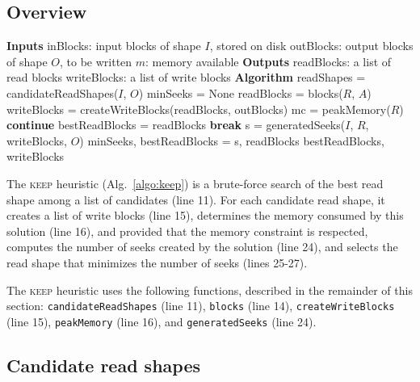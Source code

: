 \documentclass[sigconf, nonacm]{acmart}
\newcommand{\keep}[0]{\textsc{keep}\xspace}
\begin{document}
\subsection{Overview}

\begin{algorithm}
  \caption{\keep heuristic (implements \texttt{getReadWriteBlocks})}
  \label{algo:keep}
  \begin{algorithmic}[1]
    \STATE \textbf{Inputs}
    \STATE inBlocks: input blocks of shape $I$, stored on disk
    \STATE outBlocks: output blocks of shape $O$, to be written
    \STATE $m$: memory available
    \STATE
    \STATE \textbf{Outputs}
    \STATE readBlocks: a list of read blocks
    \STATE writeBlocks: a list of write blocks
    \STATE
    \STATE \textbf{Algorithm}
    \STATE readShapes = candidateReadShapes($I$, $O$)
    \STATE minSeeks = None
      \STATE readBlocks = blocks($R$, $A$)
      \STATE writeBlocks = createWriteBlocks(readBlocks, outBlocks)
      \STATE mc = peakMemory($R$)
      \STATE \textbf{continue} 
      \ENDIF
      \STATE bestReadBlocks = readBlocks
      \STATE \textbf{break} 
      \ENDIF
      \STATE s = generatedSeeks($I$, $R$, writeBlocks, $O$)
      \STATE minSeeks, bestReadBlocks = s, readBlocks
      \ENDIF
    \ENDFOR
    \RETURN bestReadBlocks, writeBlocks
  \end{algorithmic}
\end{algorithm}
The \keep heuristic (Alg.~\ref{algo:keep}) is a brute-force search
of the best read shape among a list of candidates (line 11).
For each candidate read shape, it creates a list of write blocks (line
15), determines the memory consumed by this solution (line 16), and provided that the
memory constraint is respected, computes
the number of seeks created by the solution (line
24), and selects the read shape that minimizes the number of seeks (lines
25-27).

The \keep heuristic uses the following functions, described in the
remainder of this section: \texttt{candidateReadShapes} (line 11),
\texttt{blocks} (line 14), \texttt{createWriteBlocks} (line 15),
\texttt{peakMemory} (line 16), and
\texttt{generatedSeeks} (line 24).

\subsection{Candidate read shapes}
\end{document}
